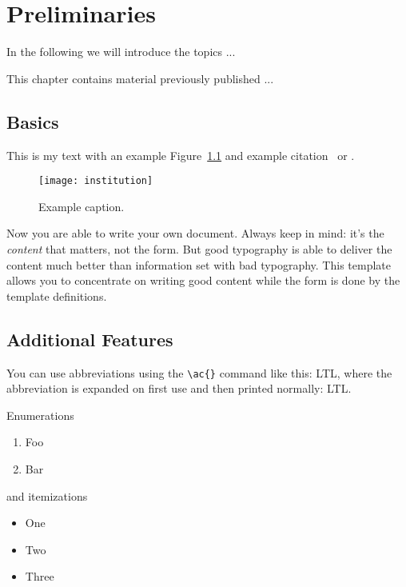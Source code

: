 \chapter{Preliminaries} \label{ch:prelim}

In the following we will  introduce the topics ... 


\begin{chapternotes}
  This chapter contains material previously published ...
\end{chapternotes}

\section{Basics}

This is my text with an example Figure~\ref{fig:example} and example
citation~\cite{Bringhurst1993} or \textcite{Bringhurst1993}. 

\begin{figure}
	\centering
	\texttt{[image: institution]}
	\caption{Example caption.}
	\label{fig:example}
\end{figure}

Now you are able to write your own document. Always keep in mind: it's
the \emph{content} that matters, not the form. But good typography is
able to deliver the content much better than information set with bad
typography. This template allows you to concentrate on writing good
content while the form is done by the template definitions.

\section{Additional Features}

You can use abbreviations using the \verb+\ac{}+ command like this: \ac{LTL}, 
where the abbreviation is expanded on first use and then printed normally: \ac{LTL}. 

Enumerations
\begin{enumerate}
	\item Foo
	\item Bar
\end{enumerate}

and itemizations
\begin{itemize}
	\item One
	\item Two
	\item Three
\end{itemize}

